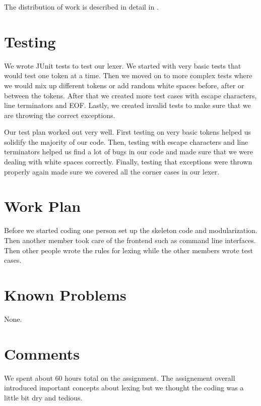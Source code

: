 \documentclass{hw}
\begin{document}
The distribution of work is described in detail in .

\section{Testing}\label{sec:testing}
We wrote JUnit tests to test our lexer. We started with very basic tests that 
would test one token at a time. Then we moved on to more complex tests where 
we would mix up different tokens or add random white spaces before, after or between the 
tokens. After that we created more test cases with escape characters, line terminators
and EOF. Lastly, we created invalid tests to make sure that we are throwing the correct
exceptions.

Our test plan worked out very well. First testing on very basic tokens helped us solidify
the majority of our code. Then, testing with escape characters and line terminators helped 
us find a lot of bugs in our code and made sure that we were dealing with white spaces correctly.
Finally, testing that exceptions were thrown properly again made sure we covered all the corner
cases in our lexer. 
\section{Work Plan}\label{sec:workplan}
Before we started coding one person set up the skeleton code and modularization. Then another 
member took care of the frontend such as command line interfaces. Then other people 
wrote the rules for lexing while the other members wrote test cases.  
\section{Known Problems}\label{sec:problems}
None.
\section{Comments}\label{sec:comments}
We spent about 60 hours total on the assignment. The assignement overall introduced
important concepts about lexing but we thought the coding was a little bit dry and tedious.
\end{document}
